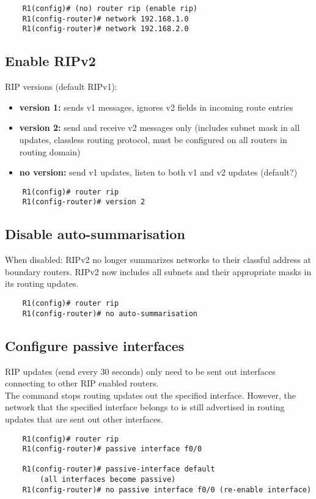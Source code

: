 \documentclass[10pt, a4paper]{article}
\begin{document}
	\begin{lstlisting}
	R1(config)# (no) router rip (enable rip)
	R1(config-router)# network 192.168.1.0
	R1(config-router)# network 192.168.2.0
	\end{lstlisting}

	\subsection{Enable RIPv2}
	RIP versions (default RIPv1):
	\begin{itemize}[noitemsep,nolistsep]
		\item \textbf{version 1:} sends v1 messages, ignores v2 fields in incoming route entries
		\item \textbf{version 2:} send and receive v2 messages only (includes subnet mask in all updates, classless routing protocol, must be configured on all routers in routing domain)
		\item \textbf{no version:} send v1 updates, listen to both v1 and v2 updates (default?)\\
	\end{itemize}
	\begin{lstlisting}
	R1(config)# router rip
	R1(config-router)# version 2
	\end{lstlisting}

	\subsection{Disable auto-summarisation}
	When disabled: RIPv2 no longer summarizes networks to their classful address at boundary routers. RIPv2 now includes all subnets and their appropriate masks in its routing updates.\\
	\begin{lstlisting}
	R1(config)# router rip
	R1(config-router)# no auto-summarisation
	\end{lstlisting}

	\subsection{Configure passive interfaces}
	RIP updates (send every 30 seconds) only need to be sent out interfaces connecting to other RIP enabled routers.\\
	The command stops routing updates out the specified interface. However, the network that the specified interface belongs to is still advertised in routing updates that are sent out other interfaces.\\
	\begin{lstlisting}
	R1(config)# router rip
	R1(config-router)# passive interface f0/0

	R1(config-router)# passive-interface default
		(all interfaces become passive)
	R1(config-router)# no passive interface f0/0 (re-enable interface)
	\end{lstlisting}
\end{document}
